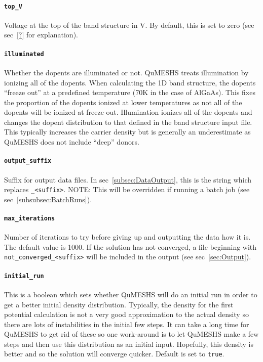 \documentclass[12pt]{article}
\begin{document}
\paragraph{\texttt{top\_V}}
Voltage at the top of the band structure in V.  By default, this is set to zero (see
sec~\ref{?} for explanation).

\paragraph{\texttt{illuminated}}
Whether the dopents are illuminated or not.  QuMESHS treats illumination by ionizing all
of the dopents.  When calculating the 1D band structure, the dopents ``freeze out'' at
a predefined temperature (70K in the case of AlGaAs).  This fixes the proportion of the
dopents ionized at lower temperatures as not all of the dopents will be ionized at
freeze-out.  Illumination ionizes all of the dopents and changes the dopent distribution
to that defined in the band structure input file.  This typically increases the carrier
density but is generally an underestimate as QuMESHS does not include ``deep'' donors.

\paragraph{\texttt{output\_suffix}}
Suffix for output data files.  In sec~\ref{subsec:DataOutput}, this is the string which
replaces \texttt{\_<suffix>}. {\color{red} NOTE:} This will be overridden if running
a batch job (see sec~\ref{subsubsec:BatchRuns}).

\paragraph{\texttt{max\_iterations}}
Number of iterations to try before giving up and outputting the data how it is.  The
default value is 1000.  If the solution has not converged, a file beginning with
\texttt{not\_converged\_<suffix>} will be included in the output (see sec~\ref{sec:Output}).

\paragraph{\texttt{initial\_run}}
This is a boolean which sets whether QuMESHS will do an initial run in order to get a
better initial density distribution.  Typically, the density for the first potential
calculation is not a very good approximation to the actual density so there are lots of
instabilities in the initial few steps.  It can take a long time for QuMESHS to get rid
of these so one work-around is to let QuMESHS make a few steps and then use this distribution
as an initial input.  Hopefully, this density is better and so the solution will converge quicker.
Default is set to \texttt{true}.
\end{document}
